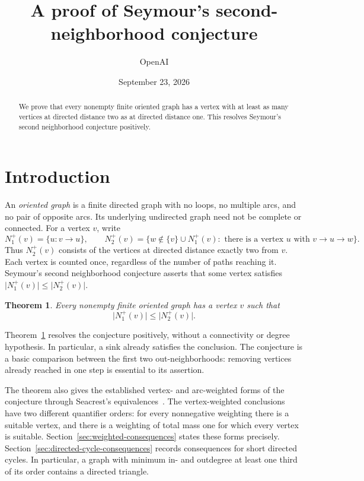 \documentclass[11pt]{article}
\title{A proof of Seymour's second-neighborhood conjecture}
\author{OpenAI}
\date{September 23, 2026}
\newtheorem{theorem}{Theorem}[section]
\theoremstyle{remark}
\newcommand{\abs}[1]{\lvert #1\rvert}
\begin{document}
\maketitle
\begin{abstract}
We prove that every nonempty finite oriented graph has a vertex with at least
as many vertices at directed distance two as at directed distance one.
This resolves Seymour's second neighborhood conjecture positively.
\end{abstract}
\section{Introduction}\label{sec:introduction}

An \emph{oriented graph} is a finite directed graph with no loops, no multiple
arcs, and no pair of opposite arcs.  Its underlying undirected graph need
not be complete or connected.  For a vertex \(v\), write
\[
 N_1^+(v)=\{u:v\to u\},\qquad
 N_2^+(v)=\{w\notin\{v\}\cup N_1^+(v):
                 \text{ there is a vertex }u\text{ with }v\to u\to w\}.
\]
Thus \(N_2^+(v)\) consists of the vertices at directed distance exactly two
from \(v\).  Each vertex is counted once, regardless of the number of paths
reaching it.  Seymour's second neighborhood conjecture asserts that some
vertex satisfies \(\abs{N_1^+(v)}\leq\abs{N_2^+(v)}\).

\begin{theorem}\label{thm:main}
Every nonempty finite oriented graph has a vertex \(v\) such that
\[
 \abs{N_1^+(v)}\leq \abs{N_2^+(v)}.
\]
\end{theorem}

Theorem~\ref{thm:main} resolves the conjecture positively, without a
connectivity or degree hypothesis.  In particular, a sink already satisfies
the conclusion.  The conjecture is a basic comparison between the first two
out-neighborhoods: removing vertices already reached in one step is essential
to its assertion.

The theorem also gives the established vertex- and arc-weighted forms of
the conjecture through Seacrest's equivalences~\cite{Seacrest2015}.
The vertex-weighted conclusions have two different quantifier orders:
for every nonnegative weighting there is a suitable vertex, and there is
a weighting of total mass one for which every vertex is suitable.
Section~\ref{sec:weighted-consequences} states these forms precisely.
Section~\ref{sec:directed-cycle-consequences} records consequences for
short directed cycles.  In particular, a graph with minimum in- and
outdegree at least one third of its order contains a directed triangle.
\end{document}
